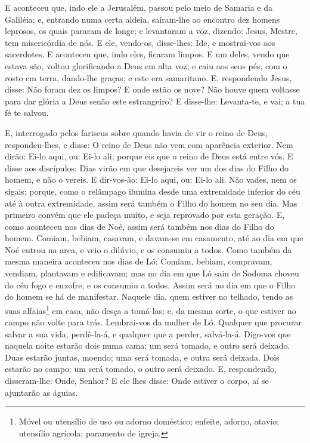 E aconteceu que, indo ele a Jerusalém, passou pelo meio de
Samaria e da Galiléia; e, entrando numa certa aldeia,
saíram-lhe ao encontro dez homens leprosos, os quais pararam de
longe; e levantaram a voz, dizendo: Jesus, Mestre, tem
misericórdia de nós. E ele, vendo-os, disse-lhes: Ide, e
mostrai-vos aos sacerdotes. E aconteceu que, indo eles, ficaram
limpos. E um deles, vendo que estava são, voltou glorificando
a Deus em alta voz; e caiu aos seus pés, com o rosto em
terra, dando-lhe graças; e este era samaritano. E,
respondendo Jesus, disse: Não foram dez os limpos? E onde estão os
nove? Não houve quem voltasse para dar glória a Deus senão
este estrangeiro? E disse-lhe: Levanta-te, e vai; a tua fé te
salvou.

E, interrogado pelos fariseus sobre quando havia de vir o reino
de Deus, respondeu-lhes, e disse: O reino de Deus não vem com
aparência exterior. Nem dirão: Ei-lo aqui, ou: Ei-lo ali;
porque eis que o reino de Deus está entre vós. E disse aos
discípulos: Dias virão em que desejareis ver um dos dias do Filho do
homem, e não o vereis. E dir-vos-ão: Ei-lo aqui, ou: Ei-lo
ali. Não vades, nem os sigais; porque, como o relâmpago
ilumina desde uma extremidade inferior do céu até à outra
extremidade, assim será também o Filho do homem no seu dia.
Mas primeiro convém que ele padeça muito, e seja reprovado
por esta geração. E, como aconteceu nos dias de Noé, assim
será também nos dias do Filho do homem. Comiam, bebiam,
casavam, e davam-se em casamento, até ao dia em que Noé entrou na
arca, e veio o dilúvio, e os consumiu a todos. Como também da
mesma maneira aconteceu nos dias de Ló: Comiam, bebiam, compravam,
vendiam, plantavam e edificavam; mas no dia em que Ló saiu de
Sodoma choveu do céu fogo e enxofre, e os consumiu a todos.
Assim será no dia em que o Filho do homem se há de
manifestar. Naquele dia, quem estiver no telhado, tendo as
suas alfaias\footnote{Móvel ou utensílio de uso ou adorno doméstico;
enfeite, adorno, atavio; utensílio agrícola; paramento de igreja.}
em casa, não desça a tomá-las; e, da mesma sorte, o que estiver no
campo não volte para trás. Lembrai-vos da mulher de Ló.
Qualquer que procurar salvar a sua vida, perdê-la-á, e
qualquer que a perder, salvá-la-á. Digo-vos que naquela noite
estarão dois numa cama; um será tomado, e outro será deixado.
Duas estarão juntas, moendo; uma será tomada, e outra será
deixada. Dois estarão no campo; um será tomado, o outro será
deixado. E, respondendo, disseram-lhe: Onde, Senhor? E ele
lhes disse: Onde estiver o corpo, aí se ajuntarão as águias.

